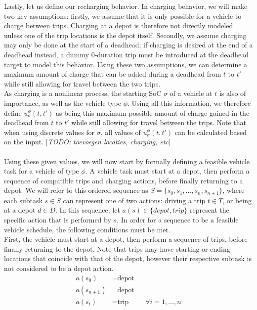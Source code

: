 \documentclass[]{article}
\newcommand{\todo}[1]{{\color{red}[\textit{TODO: #1}]}}
\begin{document}
Lastly, let us define our recharging behavior. In charging behavior, we will make two key assumptions: firstly, we assume that it is only possible for a vehicle to charge between trips. Charging at a depot is therefore not directly modeled unless one of the trip locations is the depot itself. Secondly, we assume charging may only be done at the start of a deadhead; if charging is desired at the end of a deadhead instead, a dummy 0-duration trip must be introduced at the deadhead target to model this behavior. Using these two assumptions, we can determine a maximum amount of charge that can be added during a deadhead from $t$ to $t'$ while still allowing for travel between the two trips. \\
As charging is a nonlinear process, the starting SoC $\sigma$ of a vehicle at $t$ is also of importance, as well as the vehicle type $\phi$. Using all this information, we therefore define $u^\phi_\sigma(t, t')$ as being this maximum possible amount of charge gained in the deadhead from $t$ to $t'$ while still allowing for travel between the trips. Note that when using discrete values for $\sigma$, all values of $u^\phi_\sigma(t, t')$ can be calculated based on the input. \todo{toevoegen locaties, charging, etc} \\\\
Using these given values, we will now start by formally defining a feasible vehicle task for a vehicle of type $\phi$. A vehicle task must start at a depot, then perform a sequence of compatible trips and charging actions, before finally returning to a depot. We will refer to this ordered sequence as $S = \{ s_0, s_1, \dots, s_n, s_{n+1} \}$, where each subtask $s \in S$ can represent one of two actions: driving a trip $t \in T$, or being at a depot $d \in D$. In this sequence, let $a(s) \in \{ depot, trip \}$ represent the specific action that is performed by $s$. In order for a sequence to be a feasible vehicle schedule, the following conditions must be met. \\
First, the vehicle must start at a depot, then perform a sequence of trips, before finally returning to the depot. Note that trips may have starting or ending locations that coincide with that of the depot, however their respective subtask is not considered to be a depot action.
\begin{align}
  a(s_0) &= \text{depot} && \\
  a(s_{n+1}) &= \text{depot} && \\ 
  a(s_i) &= \text{trip} && \forall i = 1, \dots, n
\end{align}
\end{document}
